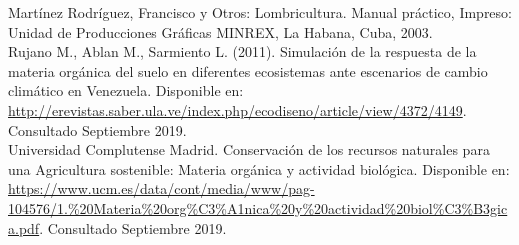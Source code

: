 \noindent

\noindent

\noindent

\noindent 

\noindent

\noindent

\noindent

\noindent
Martínez Rodríguez, Francisco y Otros: Lombricultura. Manual pr\'actico, Impreso: Unidad de Producciones Gr\'aficas MINREX, La Habana, Cuba, 2003.\\

\noindent
Rujano M., Ablan M., Sarmiento L. (2011). Simulaci\'on de la respuesta de la materia org\'anica del suelo en diferentes ecosistemas ante escenarios de cambio clim\'atico en Venezuela. Disponible en: \url{http://erevistas.saber.ula.ve/index.php/ecodiseno/article/view/4372/4149}. Consultado Septiembre 2019.\\

\noindent
Universidad Complutense Madrid. Conservaci\'on de los recursos naturales para una Agricultura sostenible: Materia org\'anica y actividad biol\'ogica. Disponible en: \url{https://www.ucm.es/data/cont/media/www/pag-104576/1.\%20Materia\%20org\%C3\%A1nica\%20y\%20actividad\%20biol\%C3\%B3gica.pdf}. Consultado Septiembre 2019.\\

